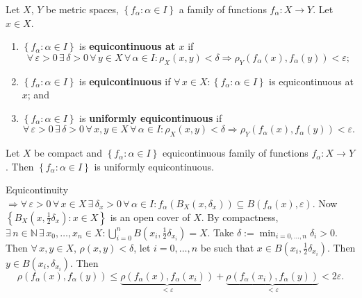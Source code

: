 \documentclass{notes}
\begin{document}
\begin{defn}
  Let $X$, $Y$ be metric spaces, $\left \{ f_\alpha : \alpha \in I \right \}$ a family of functions $f_\alpha \colon X \to Y$.
  Let $x \in X$.

  \begin{enumerate}
    \item $\left \{ f_\alpha : \alpha \in I \right \}$ is {\boldmath \bfseries equicontinuous at $x$} if 
    \[
      \forall \, \varepsilon > 0 \, \exists \, \delta > 0 \, \forall \, y \in X \, \forall \, \alpha \in I: \rho_X(x, y) < \delta \Rightarrow \rho_Y(f_\alpha(x), f_\alpha(y)) < \varepsilon; 
    \]
    
    \item $\left \{ f_\alpha : \alpha \in I \right \}$ is {\boldmath \bfseries equicontinuous} if $\forall \, x \in X: \left \{ f_\alpha : \alpha \in I \right \}$ is equicontinuous at $x$; and 

    \item $\left \{ f_\alpha : \alpha \in I \right \}$ is {\boldmath \bfseries uniformly equicontinuous} if 
    \[
      \forall \, \varepsilon > 0 \, \exists \, \delta > 0 \, \forall \, x, y \in X \, \forall \, \alpha \in I: \rho_X(x, y) < \delta \Rightarrow \rho_Y(f_\alpha(x), f_\alpha(y)) < \varepsilon.
    \]
  \end{enumerate}
\end{defn}

\begin{lem}
  Let $X$ be compact and $\left \{ f_\alpha : \alpha \in I \right \}$ equicontinuous family of functions $f_\alpha \colon X \to Y$.
  Then $\left \{ f_\alpha : \alpha \in I \right \}$ is uniformly equicontinuous.
\end{lem}

\begin{prf}
  Equicontinuity $\Rightarrow \forall \, \varepsilon > 0 \, \forall \, x \in X \, \exists \, \delta_x > 0 \, \forall \, \alpha \in I: f_\alpha(B_X(x, \delta_x)) \subseteq B(f_\alpha(x), \varepsilon)$.
  Now $\left \{ B_X \left ( x, \frac{1}{2} \delta_x \right ) : x \in X \right \}$ is an open cover of $X$.
  By compactness, $\exists \, n \in \mathbb N \, \exists \, x_0, \dots, x_n \in X: \bigcup_{i = 0}^n B \left ( x_i, \frac{1}{2} \delta_{x_i} \right ) = X$.
  Take $\delta := \min_{i = 0, \dots, n} \delta_i > 0$.
  Then $\forall \, x, y \in X$, $\rho(x, y) < \delta$, let $i = 0, \dots, n$ be such that $x \in B \left ( x_i, \frac{1}{2} \delta_{x_i} \right )$.
  Then $y \in B(x_i, \delta_{x_i})$.
  Then 
  \[
    \rho(f_\alpha(x), f_\alpha(y)) \leq \underbrace{\rho(f_\alpha(x), f_\alpha(x_i))}_{{} < \varepsilon} + \underbrace{\rho(f_\alpha(x_i), f_\alpha(y))}_{{} < \varepsilon} < 2 \varepsilon.
  \]
\end{prf}
\end{document}
